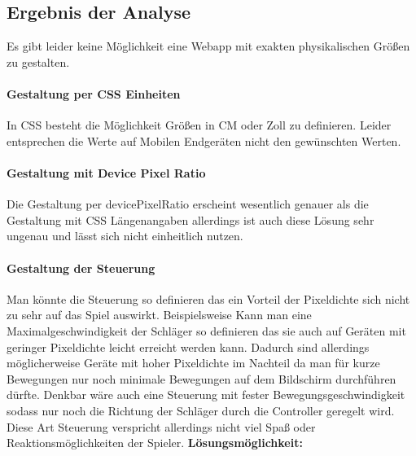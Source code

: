 \subsection{Ergebnis der Analyse}
Es gibt leider keine Möglichkeit eine Webapp mit exakten physikalischen Größen zu gestalten.
\paragraph{Gestaltung per CSS Einheiten} In CSS besteht die Möglichkeit Größen in CM oder Zoll zu definieren. Leider entsprechen die Werte auf Mobilen Endgeräten nicht den gewünschten Werten.
\paragraph{Gestaltung mit Device Pixel Ratio} Die Gestaltung per devicePixelRatio erscheint wesentlich genauer als die Gestaltung mit CSS Längenangaben allerdings ist auch diese Lösung sehr ungenau und lässt sich nicht einheitlich nutzen. 
\paragraph{Gestaltung der Steuerung} Man könnte die Steuerung so definieren das ein Vorteil der Pixeldichte sich nicht zu sehr auf das Spiel auswirkt. Beispielsweise Kann man eine Maximalgeschwindigkeit der Schläger so definieren das sie auch auf Geräten mit geringer Pixeldichte leicht erreicht werden kann. Dadurch sind allerdings möglicherweise Geräte mit hoher Pixeldichte im Nachteil da man für kurze Bewegungen nur noch minimale Bewegungen auf dem Bildschirm durchführen dürfte.
\newline
Denkbar wäre auch eine Steuerung mit fester Bewegungsgeschwindigkeit sodass nur noch die Richtung der Schläger durch die Controller geregelt wird. Diese Art Steuerung verspricht allerdings nicht viel Spaß oder Reaktionsmöglichkeiten der Spieler.
\newline
\newline
\textbf{Lösungsmöglichkeit:}
